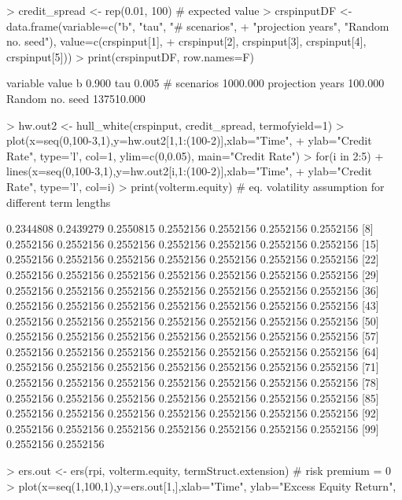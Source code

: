 \documentclass[12pt]{article}
\begin{document}
\begin{Schunk}
\begin{Sinput}
> credit_spread <- rep(0.01, 100) # expected value
> crspinputDF <- data.frame(variable=c("b", "tau", "# scenarios", 
+   "projection years",  "Random no. seed"), value=c(crspinput[1], 
+   crspinput[2], crspinput[3], crspinput[4], crspinput[5]))
> print(crspinputDF, row.names=F)
\end{Sinput}
\begin{Soutput}
         variable      value
                b      0.900
              tau      0.005
      # scenarios   1000.000
 projection years    100.000
  Random no. seed 137510.000
\end{Soutput}
\begin{Sinput}
> hw.out2 <- hull_white(crspinput, credit_spread, termofyield=1) 
> plot(x=seq(0,100-3,1),y=hw.out2[1,1:(100-2)],xlab="Time", 
+      ylab="Credit Rate", type='l', col=1, ylim=c(0,0.05), main="Credit Rate")
> for(i in 2:5)
+   lines(x=seq(0,100-3,1),y=hw.out2[i,1:(100-2)],xlab="Time", 
+     ylab="Credit Rate", type='l', col=i)
> print(volterm.equity) # eq. volatility assumption for different term lengths
\end{Sinput}
\begin{Soutput}
  [1] 0.2344808 0.2439279 0.2550815 0.2552156 0.2552156 0.2552156 0.2552156
  [8] 0.2552156 0.2552156 0.2552156 0.2552156 0.2552156 0.2552156 0.2552156
 [15] 0.2552156 0.2552156 0.2552156 0.2552156 0.2552156 0.2552156 0.2552156
 [22] 0.2552156 0.2552156 0.2552156 0.2552156 0.2552156 0.2552156 0.2552156
 [29] 0.2552156 0.2552156 0.2552156 0.2552156 0.2552156 0.2552156 0.2552156
 [36] 0.2552156 0.2552156 0.2552156 0.2552156 0.2552156 0.2552156 0.2552156
 [43] 0.2552156 0.2552156 0.2552156 0.2552156 0.2552156 0.2552156 0.2552156
 [50] 0.2552156 0.2552156 0.2552156 0.2552156 0.2552156 0.2552156 0.2552156
 [57] 0.2552156 0.2552156 0.2552156 0.2552156 0.2552156 0.2552156 0.2552156
 [64] 0.2552156 0.2552156 0.2552156 0.2552156 0.2552156 0.2552156 0.2552156
 [71] 0.2552156 0.2552156 0.2552156 0.2552156 0.2552156 0.2552156 0.2552156
 [78] 0.2552156 0.2552156 0.2552156 0.2552156 0.2552156 0.2552156 0.2552156
 [85] 0.2552156 0.2552156 0.2552156 0.2552156 0.2552156 0.2552156 0.2552156
 [92] 0.2552156 0.2552156 0.2552156 0.2552156 0.2552156 0.2552156 0.2552156
 [99] 0.2552156 0.2552156
\end{Soutput}
\begin{Sinput}
> ers.out <- ers(rpi, volterm.equity, termStruct.extension) # risk premium = 0 
> plot(x=seq(1,100,1),y=ers.out[1,],xlab="Time", ylab="Excess Equity Return", 

\end{Sinput}
\end{Schunk}
\end{document}
